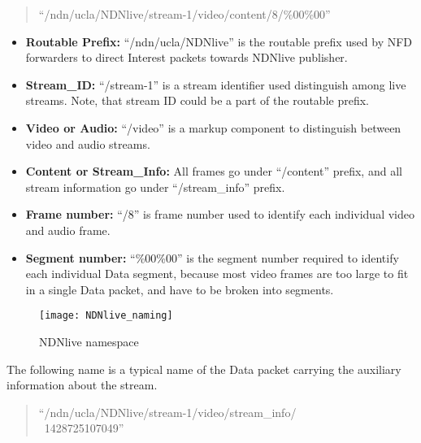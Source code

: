 \begin{quote}
``/ndn/ucla/NDNlive/stream-1/video/content/8/\%00\%00''
\end{quote}
\begin{itemize}
	\item{\textbf{Routable Prefix:}} ``/ndn/ucla/NDNlive'' is the routable prefix used by NFD forwarders to direct  Interest packets towards NDNlive publisher.
	\item{\textbf{Stream\_ID:}} ``/stream-1'' is a stream identifier used distinguish among live streams. Note, that stream ID could be a part of the routable prefix.
	\item{\textbf{Video or Audio:}} ``/video'' is a markup component to distinguish between video and audio streams.
	\item{\textbf{Content or Stream\_Info:}} All frames go under ``/content'' prefix, and all stream information go under ``/stream\_info'' prefix.
	\item{\textbf{Frame number:}} ``/8'' is frame number used to identify each individual video and audio frame.
	\item{\textbf{Segment number:}} ``\%00\%00'' is the segment number required to identify each individual Data segment, because most video frames are too large to fit in a single Data packet, and have to be broken into segments. 
	
\end{itemize}


\begin{figure}%
  \centering
  \texttt{[image: NDNlive\_naming]}
  \vspace{-0.3cm}
  \caption{NDNlive namespace}
  \label{fig:NDNlive_naming}
\end{figure}

The following name is a typical name of the Data packet carrying the auxiliary information about the stream.
\begin{quote}
``/ndn/ucla/NDNlive/stream-1/video/stream\_info/ \\\ 1428725107049''
\end{quote}

